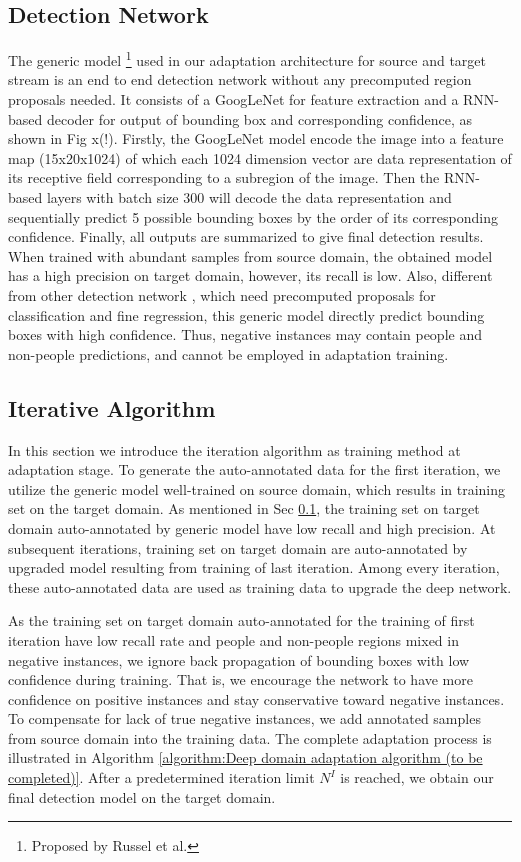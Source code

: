 \documentclass[runningheads]{llncs}
\begin{document}
\subsection{Detection Network}
\label{section:Detection Network}
The generic model \footnote{Proposed by Russel et al.} used in our adaptation architecture for source and target stream is an end to end detection network without any precomputed region proposals needed. It consists of a GoogLeNet \cite{szegedy2015going} for feature extraction and a RNN-based decoder for output of bounding box and corresponding confidence, as shown in Fig x(!). Firstly, the GoogLeNet model encode the image into a feature map (15x20x1024) of which each 1024 dimension vector are data representation of its receptive field corresponding to a subregion of the image. Then the RNN-based layers with batch size 300 will decode the data representation and sequentially predict 5 possible bounding boxes by the order of its corresponding confidence. Finally, all outputs are summarized to give final detection results. When trained with abundant samples from source domain, the obtained model has a high precision on target domain, however, its recall is low. Also, different from other detection network \cite{girshick2015fast,vu2015context}, which need precomputed proposals for classification and fine regression, this generic model directly predict bounding boxes with high confidence. Thus, negative instances may contain people and non-people predictions, and cannot be employed in adaptation training.


\subsection{Iterative Algorithm}
In this section we introduce the iteration algorithm as training method at adaptation stage. To generate the auto-annotated data for the first iteration, we utilize the generic model well-trained on source domain, which results in training set on the target domain. As mentioned in Sec \ref{section:Detection Network}, the training set on target domain auto-annotated by generic model have low recall and high precision. At subsequent iterations, training set on target domain are auto-annotated by upgraded model resulting from training of last iteration. Among every iteration, these auto-annotated data are used as training data to upgrade the deep network.

As the training set on target domain auto-annotated for the training of first iteration have low recall rate and people and non-people regions mixed in negative instances, we ignore back propagation of bounding boxes with low confidence during training. That is, we encourage the network to have more confidence on positive instances and stay conservative toward negative instances. To compensate for lack of true negative instances, we add annotated samples from source domain into the training data. The complete adaptation process is illustrated in Algorithm \ref{algorithm:Deep domain adaptation algorithm (to be completed)}. After a predetermined iteration limit $N^{I}$ is reached, we obtain our final detection model on the target domain.
\end{document}
